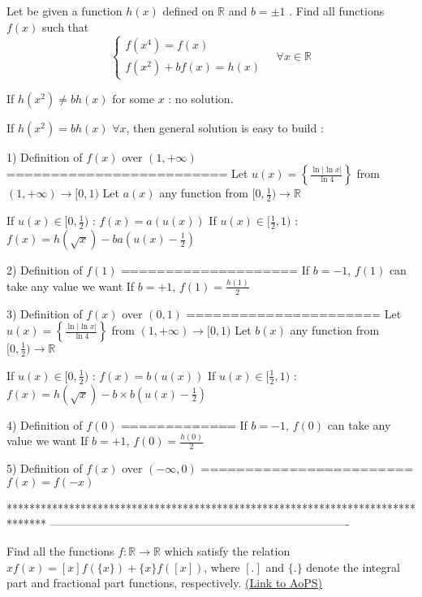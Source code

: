 \begin{solution}
	\begin{tcolorbox}Let be given a function $h(x)$ defined on  $ \mathbb{ R}$ and $b= \pm1$ . Find all  functions $f(x)$ such that \[\begin{cases}f(x^4)=f(x)\\f(x^2)+bf(x)=h(x) \end{cases}\quad \forall x\in\mathbb R\]\end{tcolorbox}
If $h(x^2)\ne bh(x)$ for some $x$ : no solution.

If $h(x^2)=bh(x)$ $\forall x$, then general solution is easy to build :

1) Definition of $f(x)$ over $(1,+\infty)$
=========================
Let $u(x)=\left\{\frac{\ln |\ln x|}{\ln 4}\right\}$ from $(1,+\infty)\to[0,1)$
Let $a(x)$ any function from $[0,\frac 12)\to\mathbb R$

If $u(x)\in[0,\frac 12)$ : $f(x)=a(u(x))$
If $u(x)\in[\frac 12,1)$ : $f(x)=h(\sqrt x)-ba(u(x)-\frac 12)$

2) Definition of $f(1)$
====================
If $b=-1$, $f(1)$ can take any value we want
If $b=+1$, $f(1)=\frac{h(1)}2$

3) Definition of $f(x)$ over $(0,1)$
======================
Let $u(x)=\left\{\frac{\ln |\ln x|}{\ln 4}\right\}$ from $(1,+\infty)\to[0,1)$
Let $b(x)$ any function from $[0,\frac 12)\to\mathbb R$

If $u(x)\in[0,\frac 12)$ : $f(x)=b(u(x))$
If $u(x)\in[\frac 12,1)$ : $f(x)=h(\sqrt x)-b\times b(u(x)-\frac 12)$

4) Definition of $f(0)$
=============
If $b=-1$, $f(0)$ can take any value we want
If $b=+1$, $f(0)=\frac{h(0)}2$

5) Definition of $f(x)$ over $(-\infty,0)$
========================
$f(x)=f(-x)$
\end{solution}
*******************************************************************************
-------------------------------------------------------------------------------

\begin{problem}
	Find all the functions $f: \mathbb{R}\to\mathbb{R}$ which satisfy the relation $xf(x)=[ x ]f(\{ x \})+\{ x \}f([ x])$, where $[ . ]$ and $\{ . \}$ denote the integral part and fractional part functions, respectively.
	\flushright \href{https://artofproblemsolving.com/community/q2h564541}{(Link to AoPS)}
\end{problem}



